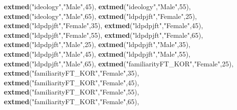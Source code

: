 \documentclass[
]{article}
\newenvironment{Shaded}{\begin{snugshade}}{\end{snugshade}}
\newcommand{\DecValTok}[1]{\textcolor[rgb]{0.00,0.00,0.81}{#1}}
\newcommand{\KeywordTok}[1]{\textcolor[rgb]{0.13,0.29,0.53}{\textbf{#1}}}
\newcommand{\NormalTok}[1]{#1}
\newcommand{\StringTok}[1]{\textcolor[rgb]{0.31,0.60,0.02}{#1}}
\begin{document}
\begin{Shaded}
\begin{Highlighting}[]
               \KeywordTok{extmed}\NormalTok{(}\StringTok{"ideology"}\NormalTok{,}\StringTok{"Male"}\NormalTok{,}\DecValTok{45}\NormalTok{),}
               \KeywordTok{extmed}\NormalTok{(}\StringTok{"ideology"}\NormalTok{,}\StringTok{"Male"}\NormalTok{,}\DecValTok{55}\NormalTok{),}
               \KeywordTok{extmed}\NormalTok{(}\StringTok{"ideology"}\NormalTok{,}\StringTok{"Male"}\NormalTok{,}\DecValTok{65}\NormalTok{),}
               \KeywordTok{extmed}\NormalTok{(}\StringTok{"ldpdpjft"}\NormalTok{,}\StringTok{"Female"}\NormalTok{,}\DecValTok{25}\NormalTok{),}
               \KeywordTok{extmed}\NormalTok{(}\StringTok{"ldpdpjft"}\NormalTok{,}\StringTok{"Female"}\NormalTok{,}\DecValTok{35}\NormalTok{),}
               \KeywordTok{extmed}\NormalTok{(}\StringTok{"ldpdpjft"}\NormalTok{,}\StringTok{"Female"}\NormalTok{,}\DecValTok{45}\NormalTok{),}
               \KeywordTok{extmed}\NormalTok{(}\StringTok{"ldpdpjft"}\NormalTok{,}\StringTok{"Female"}\NormalTok{,}\DecValTok{55}\NormalTok{),}
               \KeywordTok{extmed}\NormalTok{(}\StringTok{"ldpdpjft"}\NormalTok{,}\StringTok{"Female"}\NormalTok{,}\DecValTok{65}\NormalTok{),}
               \KeywordTok{extmed}\NormalTok{(}\StringTok{"ldpdpjft"}\NormalTok{,}\StringTok{"Male"}\NormalTok{,}\DecValTok{25}\NormalTok{),}
               \KeywordTok{extmed}\NormalTok{(}\StringTok{"ldpdpjft"}\NormalTok{,}\StringTok{"Male"}\NormalTok{,}\DecValTok{35}\NormalTok{),}
               \KeywordTok{extmed}\NormalTok{(}\StringTok{"ldpdpjft"}\NormalTok{,}\StringTok{"Male"}\NormalTok{,}\DecValTok{45}\NormalTok{),}
               \KeywordTok{extmed}\NormalTok{(}\StringTok{"ldpdpjft"}\NormalTok{,}\StringTok{"Male"}\NormalTok{,}\DecValTok{55}\NormalTok{),}
               \KeywordTok{extmed}\NormalTok{(}\StringTok{"ldpdpjft"}\NormalTok{,}\StringTok{"Male"}\NormalTok{,}\DecValTok{65}\NormalTok{),}
               \KeywordTok{extmed}\NormalTok{(}\StringTok{"familiarityFT_KOR"}\NormalTok{,}\StringTok{"Female"}\NormalTok{,}\DecValTok{25}\NormalTok{),}
               \KeywordTok{extmed}\NormalTok{(}\StringTok{"familiarityFT_KOR"}\NormalTok{,}\StringTok{"Female"}\NormalTok{,}\DecValTok{35}\NormalTok{),}
               \KeywordTok{extmed}\NormalTok{(}\StringTok{"familiarityFT_KOR"}\NormalTok{,}\StringTok{"Female"}\NormalTok{,}\DecValTok{45}\NormalTok{),}
               \KeywordTok{extmed}\NormalTok{(}\StringTok{"familiarityFT_KOR"}\NormalTok{,}\StringTok{"Female"}\NormalTok{,}\DecValTok{55}\NormalTok{),}
               \KeywordTok{extmed}\NormalTok{(}\StringTok{"familiarityFT_KOR"}\NormalTok{,}\StringTok{"Female"}\NormalTok{,}\DecValTok{65}\NormalTok{),}

\end{Highlighting}
\end{Shaded}
\end{document}
